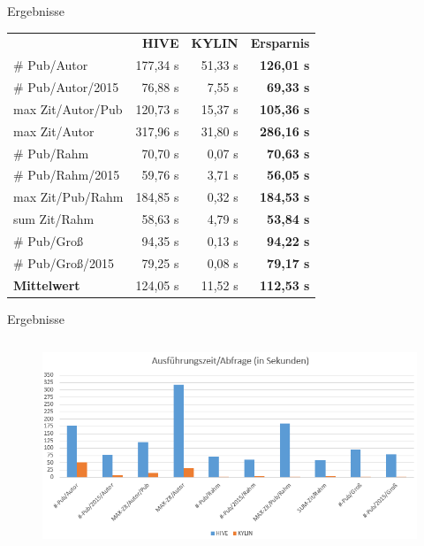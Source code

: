\documentclass[12pt, utf8, ngerman, notes]{beamer}
\begin{document}
\begin{frame}{Ergebnisse}
	\footnotesize
    \centering
	\begin{tabular}{lr|r|r}
                          & \textbf{HIVE} & \textbf{KYLIN} & \textbf{Ersparnis} \\\cmidrule[1.2pt]{2-4}
        \# Pub/Autor      &      177,34 s &        51,33 s & \textbf{126,01 s} \\\midrule
        \# Pub/Autor/2015 &       76,88 s &         7,55 s &  \textbf{69,33 s} \\\midrule
        max Zit/Autor/Pub &      120,73 s &        15,37 s & \textbf{105,36 s} \\\midrule
        max Zit/Autor     &      317,96 s &        31,80 s & \textbf{286,16 s} \\
        \midrule[1.2pt]
        \# Pub/Rahm       &       70,70 s &         0,07 s &  \textbf{70,63 s} \\\midrule
        \# Pub/Rahm/2015  &       59,76 s &         3,71 s &  \textbf{56,05 s} \\\midrule
        max Zit/Pub/Rahm  &      184,85 s &         0,32 s & \textbf{184,53 s} \\\midrule
        sum Zit/Rahm      &       58,63 s &         4,79 s &  \textbf{53,84 s} \\
        \midrule[1.2pt]
        \# Pub/Groß       &       94,35 s &         0,13 s &  \textbf{94,22 s} \\\midrule
        \# Pub/Groß/2015  &       79,25 s &         0,08 s &  \textbf{79,17 s} \\
        \midrule[1.2pt]
        \textbf{Mittelwert} &    124,05 s &        11,52 s & \textbf{112,53 s}
    \end{tabular}
\end{frame}

\begin{frame}{Ergebnisse}
\begin{columns}
      \column{\dimexpr\paperwidth}
      \begin{figure}[H]
          \begin{center}
              \includegraphics[width=\paperwidth]{pics/bigprak_dia.png}
          \end{center}
      \end{figure}
	\end{columns}
\end{frame}
\end{document}
